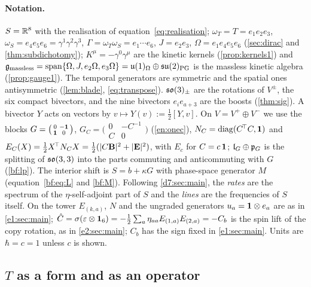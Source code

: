 \paragraph{Notation.} $S=\mathbb{R}^8$ with the realisation of equation~\cref{eq:realisation}; $\omega_T=T=e_1e_2e_3$, $\omega_S=e_4e_5e_6=\gamma^1\gamma^2\gamma^3$,
$\Gamma=\omega_T\omega_S=e_1\cdots e_6$, $J=e_2e_3$, $\Omega=e_1e_4e_5e_6$ (\cref{sec:dirac} and \cref{thm:subdichotomy}); $K^\mu=-\gamma^0\gamma^\mu$ are the kinetic kernels
(\cref{prop:kernels1}) and $\mathfrak g_{\rm massless}=\operatorname{span}\{\Omega,J,e_2\Omega,e_3\Omega\}=\mathfrak{u}(1)_\Omega\oplus\mathfrak{su}(2)_{\rm PG}$ is the
massless kinetic algebra (\cref{prop:gauge1}). The temporal generators are symmetric and the spatial ones antisymmetric
(\cref{lem:blade}, \eqref{eq:transpose}). $\mathfrak{so}(3)_\pm$ are the rotations of $V^\pm$, the six compact bivectors, and the nine bivectors $e_ie_{a+3}$ are the
boosts (\cref{thm:sig}). A bivector $Y$ acts on vectors by $v\mapsto Y(v):=\tfrac12[Y,v]$. On $V=V^+\oplus V^-$ we use the blocks $G=\bigl(\begin{smallmatrix}0&-\mathbf 1\\ \mathbf 1&0\end{smallmatrix}\bigr)$,
$G_C=\bigl(\begin{smallmatrix}0&-C^{-1}\\ C&0\end{smallmatrix}\bigr)$ (\cref{en:onec}), $N_C=\operatorname{diag}(C^{\!\top}C,\mathbf 1)$ and
$E_C(X)=\tfrac12X^{\!\top}N_CX=\tfrac12(|C\mathbf B|^2+|\mathbf E|^2)$, with $E_c$ for $C=c\,\mathbf 1$; $\mathfrak l_G\oplus\mathfrak p_G$ is the splitting of $\mathfrak{so}(3,3)$ into the
parts commuting and anticommuting with $G$ (\cref{bf:lp}). The interior shift is $S=b+\kappa G$ with phase-space generator $M$
(equation~\cref{bf:eq:L} and \cref{bf:M}). Following \cref{d7:sec:main}, the \emph{rates} are the spectrum of the $\eta$-self-adjoint part of
$S$ and the \emph{lines} are the frequencies of $S$ itself. On the tower $E_{(k,a)}$, $N$ and the ungraded generators $u_a=\mathbf 1\otimes e_a$ are as in
\cref{e1:sec:main}; $\hat C=\sigma(\varepsilon\otimes\mathbf 1_6)=-\tfrac12\sum_a\eta_{aa}E_{(1,a)}E_{(2,a)}=-C_b$ is the spin lift of the copy rotation, as in \cref{e2:sec:main}; $C_b$ has the sign fixed in \cref{e1:sec:main}. Units are $\hbar=c=1$ unless $c$ is shown. 

\subsection{\texorpdfstring{$T$ as a form and as an operator}{T as a form and as an operator}}
\label{e6:sec:Tform}

